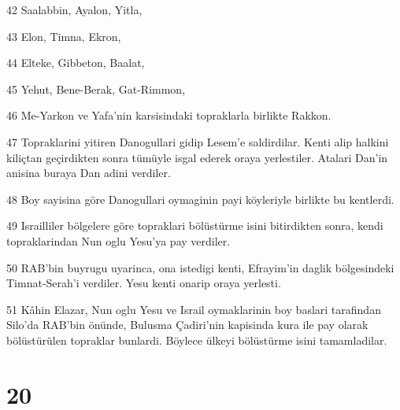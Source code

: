 \par 42 Saalabbin, Ayalon, Yitla,
\par 43 Elon, Timna, Ekron,
\par 44 Elteke, Gibbeton, Baalat,
\par 45 Yehut, Bene-Berak, Gat-Rimmon,
\par 46 Me-Yarkon ve Yafa'nin karsisindaki topraklarla birlikte Rakkon.
\par 47 Topraklarini yitiren Danogullari gidip Lesem'e saldirdilar. Kenti alip halkini kiliçtan geçirdikten sonra tümüyle isgal ederek oraya yerlestiler. Atalari Dan'in anisina buraya Dan adini verdiler.
\par 48 Boy sayisina göre Danogullari oymaginin payi köyleriyle birlikte bu kentlerdi.
\par 49 Israilliler bölgelere göre topraklari bölüstürme isini bitirdikten sonra, kendi topraklarindan Nun oglu Yesu'ya pay verdiler.
\par 50 RAB'bin buyrugu uyarinca, ona istedigi kenti, Efrayim'in daglik bölgesindeki Timnat-Serah'i verdiler. Yesu kenti onarip oraya yerlesti.
\par 51 Kâhin Elazar, Nun oglu Yesu ve Israil oymaklarinin boy baslari tarafindan Silo'da RAB'bin önünde, Bulusma Çadiri'nin kapisinda kura ile pay olarak bölüstürülen topraklar bunlardi. Böylece ülkeyi bölüstürme isini tamamladilar.

\chapter{20}

